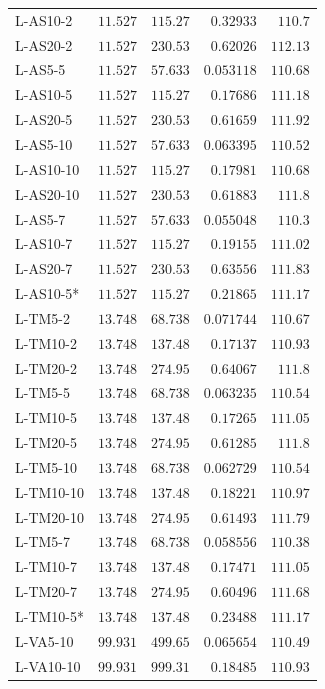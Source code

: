 \begin{longtable}{lrrrr}
L-AS10-2 & $11.527$ & $115.27$ & $0.32933$ & $110.7$ \\
L-AS20-2 & $11.527$ & $230.53$ & $0.62026$ & $112.13$ \\
L-AS5-5 & $11.527$ & $57.633$ & $0.053118$ & $110.68$ \\
L-AS10-5 & $11.527$ & $115.27$ & $0.17686$ & $111.18$ \\
L-AS20-5 & $11.527$ & $230.53$ & $0.61659$ & $111.92$ \\
L-AS5-10 & $11.527$ & $57.633$ & $0.063395$ & $110.52$ \\
L-AS10-10 & $11.527$ & $115.27$ & $0.17981$ & $110.68$ \\
L-AS20-10 & $11.527$ & $230.53$ & $0.61883$ & $111.8$ \\
L-AS5-7 & $11.527$ & $57.633$ & $0.055048$ & $110.3$ \\
L-AS10-7 & $11.527$ & $115.27$ & $0.19155$ & $111.02$ \\
L-AS20-7 & $11.527$ & $230.53$ & $0.63556$ & $111.83$ \\
L-AS10-5* & $11.527$ & $115.27$ & $0.21865$ & $111.17$ \\
L-TM5-2 & $13.748$ & $68.738$ & $0.071744$ & $110.67$ \\
L-TM10-2 & $13.748$ & $137.48$ & $0.17137$ & $110.93$ \\
L-TM20-2 & $13.748$ & $274.95$ & $0.64067$ & $111.8$ \\
L-TM5-5 & $13.748$ & $68.738$ & $0.063235$ & $110.54$ \\
L-TM10-5 & $13.748$ & $137.48$ & $0.17265$ & $111.05$ \\
L-TM20-5 & $13.748$ & $274.95$ & $0.61285$ & $111.8$ \\
L-TM5-10 & $13.748$ & $68.738$ & $0.062729$ & $110.54$ \\
L-TM10-10 & $13.748$ & $137.48$ & $0.18221$ & $110.97$ \\
L-TM20-10 & $13.748$ & $274.95$ & $0.61493$ & $111.79$ \\
L-TM5-7 & $13.748$ & $68.738$ & $0.058556$ & $110.38$ \\
L-TM10-7 & $13.748$ & $137.48$ & $0.17471$ & $111.05$ \\
L-TM20-7 & $13.748$ & $274.95$ & $0.60496$ & $111.68$ \\
L-TM10-5* & $13.748$ & $137.48$ & $0.23488$ & $111.17$ \\
L-VA5-10 & $99.931$ & $499.65$ & $0.065654$ & $110.49$ \\
L-VA10-10 & $99.931$ & $999.31$ & $0.18485$ & $110.93$ \\

\end{longtable}
